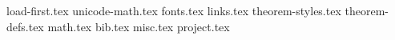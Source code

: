 
{load-first.tex}
{unicode-math.tex}
{fonts.tex}
{links.tex}
{theorem-styles.tex}
{theorem-defs.tex}
{math.tex}
{bib.tex}
{misc.tex}
{project.tex}
